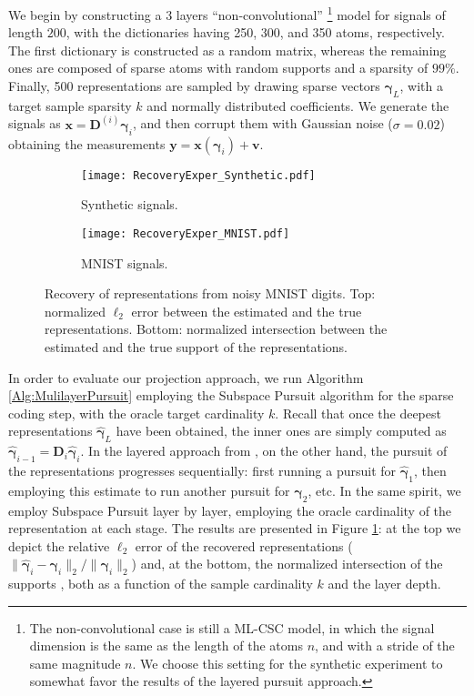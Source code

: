\documentclass[10pt,journal]{IEEEtran}
\def\x{{\mathbf x}}
\def\v{{\mathbf v}}
\def\y{{\mathbf y}}
\def\D{{\mathbf D}}
\def\gama{{\boldsymbol \gamma}}
\theoremstyle{plain}
\theoremstyle{definition}
\begin{document}
We begin by constructing a 3 layers ``non-convolutional'' \footnote{The non-convolutional case is still a ML-CSC model, in which the signal dimension is the same as the length of the atoms $n$, and with a stride of the same magnitude $n$. We choose this setting for the synthetic experiment to somewhat favor the results of the layered pursuit approach.} model for signals of length $200$, with the dictionaries having 250, 300, and 350 atoms, respectively. The first dictionary is constructed as a random matrix, whereas the remaining ones are composed of sparse atoms with random supports and a sparsity of $99\%$. Finally, 500 representations are sampled by drawing sparse vectors $\gama_L$, with a target sample sparsity $k$ and normally distributed coefficients. We generate the signals as $\x = \D^{(i)}\gama_i$, and then corrupt them with Gaussian noise ($\sigma = 0.02$) obtaining the measurements $\y = \x(\gama_i) + \v$. 

\begin{figure}
	\centering
	\begin{subfigure}{.5\textwidth}
		\texttt{[image: RecoveryExper\_Synthetic.pdf]} \\
		\caption{\footnotesize Synthetic signals.}
		\label{fig:SyntheticExperiment}
	\end{subfigure}
		

	\begin{subfigure}{.5\textwidth}
		\texttt{[image: RecoveryExper\_MNIST.pdf]} \\
		\caption{\footnotesize MNIST signals.}
		\label{fig:Recovery_MnistExperiment}
	\end{subfigure}
	\caption{Recovery of representations from noisy MNIST digits. Top: normalized $\ell_2$ error between the estimated and the true representations. Bottom: normalized intersection between the estimated and the true support of the representations.}
\end{figure}

In order to evaluate our projection approach, we run Algorithm \ref{Alg:MulilayerPursuit} employing the Subspace Pursuit algorithm \cite{dai2009subspace} for the sparse coding step, with the oracle target cardinality $k$. Recall that once the deepest representations $\hat{\gama}_L$ have been obtained, the inner ones are simply computed as $\hat{\gama}_{i-1} = \D_i\hat{\gama}_i$. In the layered approach from \cite{Papyan2016convolutional}, on the other hand, the pursuit of the representations progresses sequentially: first running a pursuit for $\hat{\gama}_1$, then employing this estimate to run another pursuit for $\hat{\gama}_2$, etc. In the same spirit, we employ Subspace Pursuit layer by layer, employing the oracle cardinality of the representation at each stage. The results are presented in Figure \ref{fig:SyntheticExperiment}: at the top we depict the relative $\ell_2$ error of the recovered representations ($\|\hat{\gama}_i- {\gama}_i\|_2 / \| {\gama}_i\|_2$) and, at the bottom, the normalized intersection of the supports \cite{Elad_Book}, both as a function of the sample cardinality $k$ and the layer depth. 
\end{document}
